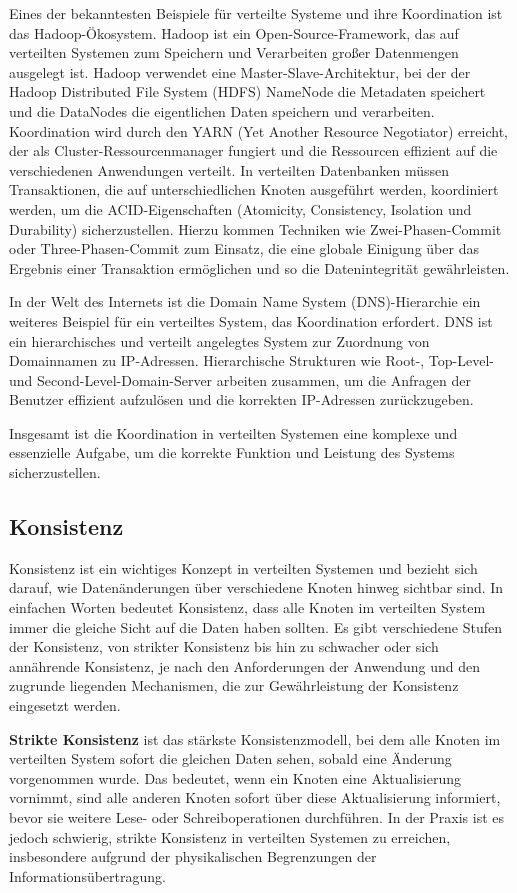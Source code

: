 Eines der bekanntesten Beispiele für verteilte Systeme und ihre Koordination ist das Hadoop-Ökosystem. Hadoop ist ein Open-Source-Framework, das auf verteilten Systemen zum Speichern und Verarbeiten großer Datenmengen ausgelegt ist. Hadoop verwendet eine Master-Slave-Architektur, bei der der Hadoop Distributed File System (HDFS) NameNode die Metadaten speichert und die DataNodes die eigentlichen Daten speichern und verarbeiten. Koordination wird durch den YARN (Yet Another Resource Negotiator) erreicht, der als Cluster-Ressourcenmanager fungiert und die Ressourcen effizient auf die verschiedenen Anwendungen verteilt. In verteilten Datenbanken müssen Transaktionen, die auf unterschiedlichen Knoten ausgeführt werden, koordiniert werden, um die ACID-Eigenschaften (Atomicity, Consistency, Isolation und Durability) sicherzustellen. Hierzu kommen Techniken wie Zwei-Phasen-Commit oder Three-Phasen-Commit zum Einsatz, die eine globale Einigung über das Ergebnis einer Transaktion ermöglichen und so die Datenintegrität gewährleisten.

In der Welt des Internets ist die Domain Name System (DNS)-Hierarchie ein weiteres Beispiel für ein verteiltes System, das Koordination erfordert. DNS ist ein hierarchisches und verteilt angelegtes System zur Zuordnung von Domainnamen zu IP-Adressen. Hierarchische Strukturen wie Root-, Top-Level- und Second-Level-Domain-Server arbeiten zusammen, um die Anfragen der Benutzer effizient aufzulösen und die korrekten IP-Adressen zurückzugeben.

Insgesamt ist die Koordination in verteilten Systemen eine komplexe und essenzielle Aufgabe, um die korrekte Funktion und Leistung des Systems sicherzustellen. 

\subsection{Konsistenz}

Konsistenz ist ein wichtiges Konzept in verteilten Systemen und bezieht sich darauf, wie Datenänderungen über verschiedene Knoten hinweg sichtbar sind. In einfachen Worten bedeutet Konsistenz, dass alle Knoten im verteilten System immer die gleiche Sicht auf die Daten haben sollten. Es gibt verschiedene Stufen der Konsistenz, von strikter Konsistenz bis hin zu schwacher oder sich annährende Konsistenz, je nach den Anforderungen der Anwendung und den zugrunde liegenden Mechanismen, die zur Gewährleistung der Konsistenz eingesetzt werden.

\textbf{Strikte Konsistenz} ist das stärkste Konsistenzmodell, bei dem alle Knoten im verteilten System sofort die gleichen Daten sehen, sobald eine Änderung vorgenommen wurde. Das bedeutet, wenn ein Knoten eine Aktualisierung vornimmt, sind alle anderen Knoten sofort über diese Aktualisierung informiert, bevor sie weitere Lese- oder Schreiboperationen durchführen. In der Praxis ist es jedoch schwierig, strikte Konsistenz in verteilten Systemen zu erreichen, insbesondere aufgrund der physikalischen Begrenzungen der Informationsübertragung.

